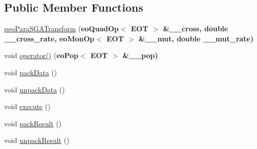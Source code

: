 \subsection*{Public Member Functions}
\begin{CompactItemize}
\item 
\hypertarget{classpeoParaSGATransform_2052bca82fbbfe5455bf6f69246d4dbf}{
\hyperlink{classpeoParaSGATransform_2052bca82fbbfe5455bf6f69246d4dbf}{peo\-Para\-SGATransform} (\bf{eo\-Quad\-Op}$<$ EOT $>$ \&\_\-\_\-cross, double \_\-\_\-cross\_\-rate, \bf{eo\-Mon\-Op}$<$ EOT $>$ \&\_\-\_\-mut, double \_\-\_\-mut\_\-rate)}
\label{classpeoParaSGATransform_2052bca82fbbfe5455bf6f69246d4dbf}

\item 
\hypertarget{classpeoParaSGATransform_669de7f7c6316fa745a15b909efb6527}{
void \hyperlink{classpeoParaSGATransform_669de7f7c6316fa745a15b909efb6527}{operator()} (\bf{eo\-Pop}$<$ EOT $>$ \&\_\-\_\-pop)}
\label{classpeoParaSGATransform_669de7f7c6316fa745a15b909efb6527}

\item 
\hypertarget{classpeoParaSGATransform_fd278bcde58d29c9a343d5cbead81a1e}{
void \hyperlink{classpeoParaSGATransform_fd278bcde58d29c9a343d5cbead81a1e}{pack\-Data} ()}
\label{classpeoParaSGATransform_fd278bcde58d29c9a343d5cbead81a1e}

\item 
\hypertarget{classpeoParaSGATransform_a43a487a6e81791c8bbf6ce30f4336ab}{
void \hyperlink{classpeoParaSGATransform_a43a487a6e81791c8bbf6ce30f4336ab}{unpack\-Data} ()}
\label{classpeoParaSGATransform_a43a487a6e81791c8bbf6ce30f4336ab}

\item 
\hypertarget{classpeoParaSGATransform_c9de2100fb897177a401c634002f6dd9}{
void \hyperlink{classpeoParaSGATransform_c9de2100fb897177a401c634002f6dd9}{execute} ()}
\label{classpeoParaSGATransform_c9de2100fb897177a401c634002f6dd9}

\item 
\hypertarget{classpeoParaSGATransform_ba08e224ceaa4149e8e1a88694a2ccf2}{
void \hyperlink{classpeoParaSGATransform_ba08e224ceaa4149e8e1a88694a2ccf2}{pack\-Result} ()}
\label{classpeoParaSGATransform_ba08e224ceaa4149e8e1a88694a2ccf2}

\item 
\hypertarget{classpeoParaSGATransform_257663dcdc6cc95b6183d472ffba1b2f}{
void \hyperlink{classpeoParaSGATransform_257663dcdc6cc95b6183d472ffba1b2f}{unpack\-Result} ()}
\label{classpeoParaSGATransform_257663dcdc6cc95b6183d472ffba1b2f}


\end{CompactItemize}
